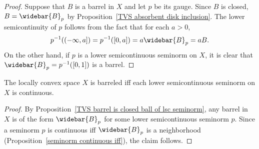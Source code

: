 \begin{proof}
Suppose that $B$ is a barrel in $X$ and let $p$ be its gauge. Since $B$ is closed, $B=\widebar{B}_p$ by Proposition~\ref{TVS absorbent disk inclusion}. The lower semicontinuity of $p$ follows from the fact that for each $a>0$, 
\[p^{-1}((-\infty,a])=p^{-1}([0,a])=a\widebar{B}_p=aB.\]
On the other hand, if $p$ is a lower semicontinuous seminorm on $X$, it is clear that $\widebar{B}_p=p^{-1}([0,1])$ is a barrel.
\end{proof}
\begin{theorem}\label{barreled iff lsc seminorm is continuous}
The locally convex space $X$ is barreled iff each lower semicontinuous seminorm on $X$ is continuous.
\end{theorem}
\begin{proof}
By Proposition~\ref{TVS barrel is closed ball of lsc seminorm}, any barrel in $X$ is of the form $\widebar{B}_p$ for some lower semicontinuous seminorm $p$. Since a seminorm $p$ is continuous iff $\widebar{B}_p$ is a neighborhood (Proposition~\ref{seminorm continuous iff}), the claim follows.
\end{proof}
